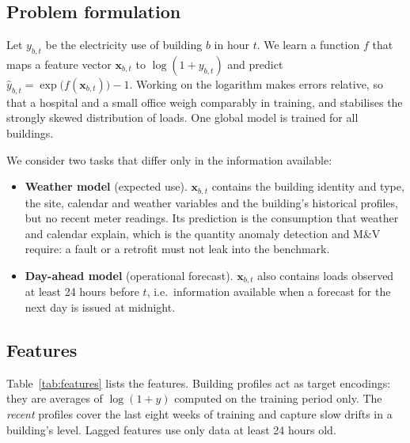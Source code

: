 \documentclass[11pt,a4paper]{article}
\begin{document}
\subsection{Problem formulation}
Let $y_{b,t}$ be the electricity use of building $b$ in hour $t$. We learn a function $f$ that maps a feature
vector $\mathbf{x}_{b,t}$ to $\log(1+y_{b,t})$ and predict $\hat{y}_{b,t} = \exp\!\big(f(\mathbf{x}_{b,t})\big)-1$.
Working on the logarithm makes errors relative, so that a hospital and a small office weigh comparably in training,
and stabilises the strongly skewed distribution of loads. One global model is trained for all buildings.

We consider two tasks that differ only in the information available:
\begin{itemize}[leftmargin=1.4em]
  \item \textbf{Weather model} (expected use). $\mathbf{x}_{b,t}$ contains the building identity and type, the site,
        calendar and weather variables and the building's historical profiles, but no recent meter readings.
        Its prediction is the consumption that weather and calendar explain, which is the quantity anomaly
        detection and M\&V require: a fault or a retrofit must not leak into the benchmark.
  \item \textbf{Day-ahead model} (operational forecast). $\mathbf{x}_{b,t}$ also contains loads observed at least
        24 hours before $t$, i.e.\ information available when a forecast for the next day is issued at midnight.
\end{itemize}

\subsection{Features}
Table~\ref{tab:features} lists the features. Building profiles act as target encodings: they are averages of
$\log(1+y)$ computed on the training period only. The \emph{recent} profiles cover the last eight weeks of training
and capture slow drifts in a building's level. Lagged features use only data at least 24 hours old.
\end{document}
